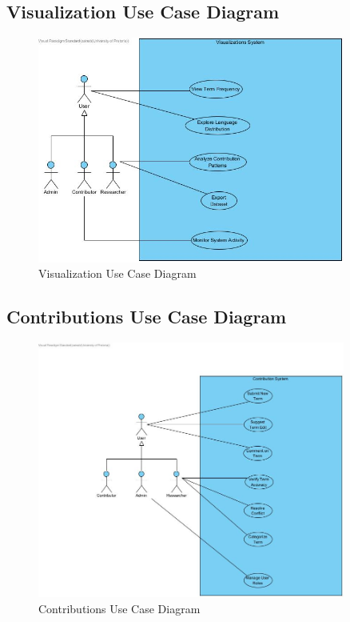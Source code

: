 \documentclass[12pt]{article}
\begin{document}
\subsection{Visualization Use Case Diagram}
\begin{figure}[H]
  \centering
  \includegraphics[width=0.9\textwidth]{Visualizations.jpg}
  \caption{Visualization Use Case Diagram}
  \label{fig:visualization-use-case}
\end{figure}

\subsection{Contributions Use Case Diagram}
\begin{figure}[H]
  \centering
  \includegraphics[width=0.9\textwidth]{Contributions.jpg}
  \caption{Contributions Use Case Diagram}
  \label{fig:contributions-use-case}
\end{figure}
\end{document}
